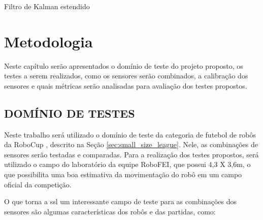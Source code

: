 \documentclass[acronym, symbols, table]{fei}
\begin{document}
			\begin{algorithm}
					\caption{Filtro de Kalman estendido}\label{alg:ekf_algoritmo}
			\end{algorithm}
			
\chapter{Metodologia}\label{sec:metodologia}

	Neste capítulo serão apresentados o domínio de teste do projeto proposto, os testes a serem realizados, como os sensores serão combinados, a calibração dos sensores e quais métricas serão analisadas para avaliação dos testes propostos.
	
	\section{DOMÍNIO DE TESTES}
	
		Neste trabalho será utilizado o domínio de teste da categoria  de futebol de robôs da RoboCup \cite{RoboCup}, descrito na Seção \ref{sec:small_size_league}. Nele, as combinações de sensores serão testadas e comparadas. Para a realização dos testes propostos, será utilizado o campo do laboratório da equipe RoboFEI, que possui 4,3 X 3,6m, o que possibilita uma boa estimativa da movimentação do robô em um campo oficial da competição.
		
		O que torna a \acrshort{ssl} um interessante campo de teste para as combinações dos sensores são algumas características dos robôs e das partidas, como:
		
\end{document}
